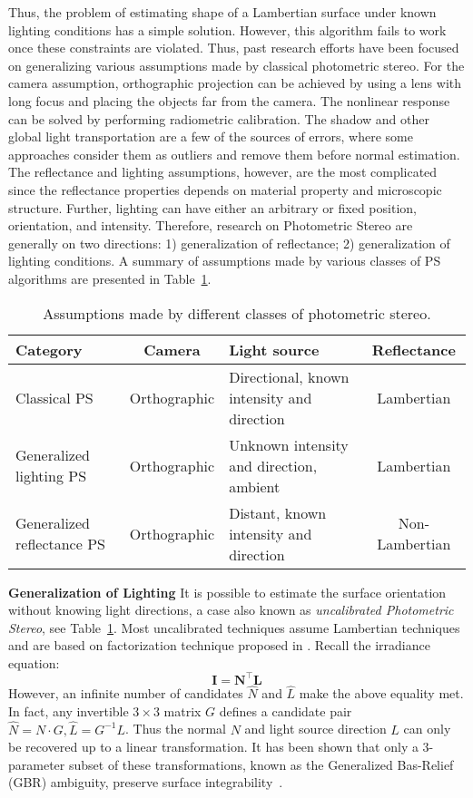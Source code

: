 Thus, the problem of estimating shape of a Lambertian surface under known lighting conditions has a simple solution. However, this algorithm fails to work once these constraints are violated. Thus, past research efforts have been focused on generalizing various assumptions made by classical photometric stereo. For the camera assumption, orthographic projection can be achieved by using a lens with long focus and placing the objects far from the camera. The nonlinear response can be solved by performing radiometric calibration. The shadow and other global light transportation are a few of the sources of errors, where some approaches consider them as outliers and remove them before normal estimation. The reflectance and lighting assumptions, however, are the most complicated since the reflectance properties depends on material property and microscopic structure. Further, lighting can have either an arbitrary or fixed position, orientation, and intensity. Therefore, research on Photometric Stereo are generally on two directions: 1) generalization of reflectance; 2) generalization of lighting conditions. A summary of assumptions made by various classes of PS algorithms are presented in Table~\ref{tab:ps_assumptions}.
\begin{table}[!htbp]
  \centering
  \begin{tabular}{p{2cm}|cp{4cm}c}
  \toprule
  \textbf{Category} & Camera & Light source & Reflectance \\
  \midrule
  Classical PS & Orthographic & Directional, known intensity and direction & Lambertian \\
  Generalized lighting PS & Orthographic & Unknown intensity and direction, ambient & Lambertian \\
  Generalized reflectance PS & Orthographic & Distant, known intensity and direction & Non-Lambertian \\
  \bottomrule
  \end{tabular}
  \caption{Assumptions made by different classes of photometric stereo.}
  \label{tab:ps_assumptions}
\end{table}

\textbf{Generalization of Lighting} 
It is possible to estimate the surface orientation without knowing light directions, a case also known as \textit{uncalibrated Photometric Stereo}, see Table~\ref{tab:ps_assumptions}. Most uncalibrated techniques assume Lambertian techniques and are based on factorization technique proposed in \cite{hayakawa1994photometric}. Recall the irradiance equation:
$$
\mathbf{I}=\mathbf{N}^\top \mathbf{L}
$$
However, an infinite number of candidates $\hat{N}$ and $\hat{L}$ make the above equality met. In fact, any invertible $3\times 3$ matrix $G$ defines a candidate pair $\hat{N} = N\cdot G, \hat{L}=G^{-1}L$. Thus the normal $N$ and light source direction $L$ can only be recovered up to a linear transformation. It has been shown that only a 3-parameter subset of these transformations, known as the Generalized Bas-Relief (GBR) ambiguity, preserve surface integrability~\cite{belhumeur1999bas}.

